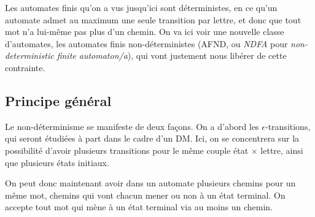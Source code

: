 Les automates finis qu'on a vus jusqu'ici sont déterministes, en ce qu'un automate admet au maximum une seule transition par lettre, et donc que tout mot n'a lui-même pas plus d'un chemin. On va ici voir une nouvelle classe d'automates, les automates finis non-déterministes (AFND, ou \textit{NDFA} pour \textit{non-deterministic finite automaton/a}), qui vont justement nous libérer de cette contrainte.

\subsection{Principe général}

Le non-déterminisme se manifeste de deux façons. On a d'abord les $\epsilon$-transitions, qui seront étudiées à part dans le cadre d'un DM. Ici, on se concentrera sur la possibilité d'avoir plusieurs transitions pour le même couple état $\times$ lettre, ainsi que plusieurs états initiaux.

On peut donc maintenant avoir dans un automate plusieurs chemins pour un même mot, chemins qui vont chacun mener ou non à un état terminal. On accepte tout mot qui mène à un état terminal via au moins un chemin.

